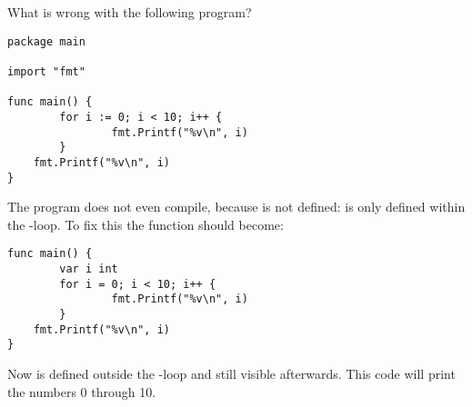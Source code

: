 \begin{Exercise}[title={Scope},difficulty=1]
\label{ex:scope}
\Question\label{ex:scope q1} What is wrong with the following program?

\begin{lstlisting}
package main

import "fmt"
                                                                                                   
func main() {
        for i := 0; i < 10; i++ {
                fmt.Printf("%v\n", i)
        }
	fmt.Printf("%v\n", i)
}
\end{lstlisting}

\end{Exercise}

\begin{Answer}
\Question
The program does not even compile, because  is
not defined:  is only defined within the -loop. To fix
this the function  should become:
\begin{lstlisting}[numbers=none]
func main() {
        var i int
        for i = 0; i < 10; i++ {
                fmt.Printf("%v\n", i)
        }
	fmt.Printf("%v\n", i)
}
\end{lstlisting}
Now  is defined outside the -loop and still visible
afterwards. This code will print the numbers 0 through 10.
\end{Answer}
